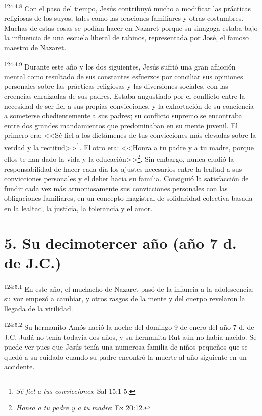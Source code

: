 \par 
\textsuperscript{124:4.8} Con el paso del tiempo, Jesús contribuyó mucho a modificar las prácticas religiosas de los suyos, tales como las oraciones familiares y otras costumbres. Muchas de estas cosas se podían hacer en Nazaret porque su sinagoga estaba bajo la influencia de una escuela liberal de rabinos, representada por José, el famoso maestro de Nazaret.

\par 
\textsuperscript{124:4.9} Durante este año y los dos siguientes, Jesús sufrió una gran aflicción mental como resultado de sus constantes esfuerzos por conciliar sus opiniones personales sobre las prácticas religiosas y las diversiones sociales, con las creencias enraizadas de sus padres. Estaba angustiado por el conflicto entre la necesidad de ser fiel a sus propias convicciones, y la exhortación de su conciencia a someterse obedientemente a sus padres; su conflicto supremo se encontraba entre dos grandes mandamientos que predominaban en su mente juvenil. El primero era: <<Sé fiel a los dictámenes de tus convicciones más elevadas sobre la verdad y la rectitud>>\footnote{\textit{Sé fiel a tus convicciones}: Sal 15:1-5.}. El otro era: <<Honra a tu padre y a tu madre, porque ellos te han dado la vida y la educación>>\footnote{\textit{Honra a tu padre y a tu madre}: Ex 20:12.}. Sin embargo, nunca eludió la responsabilidad de hacer cada día los ajustes necesarios entre la lealtad a sus convicciones personales y el deber hacia su familia. Consiguió la satisfacción de fundir cada vez más armoniosamente sus convicciones personales con las obligaciones familiares, en un concepto magistral de solidaridad colectiva basada en la lealtad, la justicia, la tolerancia y el amor.

\section*{5. Su decimotercer año (año 7 d. de J.C.)}
\par 
\textsuperscript{124:5.1} En este año, el muchacho de Nazaret pasó de la infancia a la adolescencia; su voz empezó a cambiar, y otros rasgos de la mente y del cuerpo revelaron la llegada de la virilidad.

\par 
\textsuperscript{124:5.2} Su hermanito Amós nació la noche del domingo 9 de enero del año 7 d. de J.C. Judá no tenía todavía dos años, y su hermanita Rut aún no había nacido. Se puede ver pues que Jesús tenía una numerosa familia de niños pequeños que se quedó a su cuidado cuando su padre encontró la muerte al año siguiente en un accidente.

